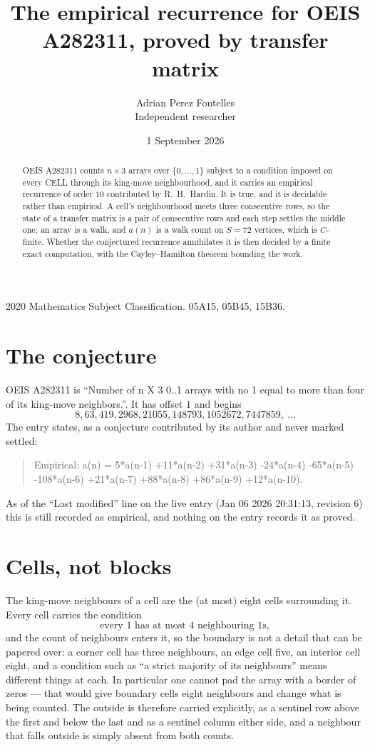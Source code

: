 \documentclass[11pt,a4paper]{article}
\title{The empirical recurrence for OEIS A282311, proved by transfer matrix}
\author{Adrian Perez Fontelles\\ \small Independent researcher}
\date{1 September 2026}
\theoremstyle{plain}
\theoremstyle{definition}
\begin{document}
\maketitle

\begin{abstract}
OEIS A282311 counts $n\times3$ arrays over $\{0,\dots,1\}$ subject to a condition imposed on
every CELL through its king-move neighbourhood, and it carries an empirical recurrence of
order $10$ contributed by R.~H.~Hardin. It is true, and it is decidable rather than
empirical. A cell's neighbourhood meets three consecutive rows, so the state of a transfer
matrix is a pair of consecutive rows and each step settles the middle one; an array is a
walk, and $a(n)$ is a walk count on $S=72$ vertices, which is $C$-finite. Whether the
conjectured recurrence annihilates it is then decided by a finite exact computation, with the
Cayley--Hamilton theorem bounding the work.
\end{abstract}

\noindent\small 2020 Mathematics Subject Classification. 05A15, 05B45, 15B36.\normalsize

\section{The conjecture}

OEIS A282311 is ``Number of n X 3 0..1 arrays with no 1 equal to more than four of its king-move neighbors.''. It has offset $1$ and begins
\[
8, 63, 419, 2968, 21055, 148793, 1052672, 7447859,\ \dots
\]
The entry states, as a conjecture contributed by its author and never marked settled:
\begin{quote}
Empirical: a(n) = 5*a(n-1) +11*a(n-2) +31*a(n-3) -24*a(n-4) -65*a(n-5) -108*a(n-6) +21*a(n-7) +88*a(n-8) +86*a(n-9) +12*a(n-10).
\end{quote}
As of the ``Last modified'' line on the live entry (Jan 06 2026 20:31:13, revision 6) this is still
recorded as empirical, and nothing on the entry records it as proved.

\section{Cells, not blocks}

The king-move neighbours of a cell are the (at most) eight cells surrounding it. Every cell
carries the condition
\[
\text{every }1\text{ has at most }4\text{ neighbouring }1\text{s},
\]
and the count of neighbours enters it, so the boundary is not a detail that can be papered
over: a corner cell has three neighbours, an edge cell five, an interior cell eight, and a
condition such as ``a strict majority of its neighbours'' means different things at each. In
particular one cannot pad the array with a border of zeros --- that would give boundary cells
eight neighbours and change what is being counted. The outside is therefore carried
explicitly, as a sentinel row above the first and below the last and as a sentinel column
either side, and a neighbour that falls outside is simply absent from both counts.
\end{document}
